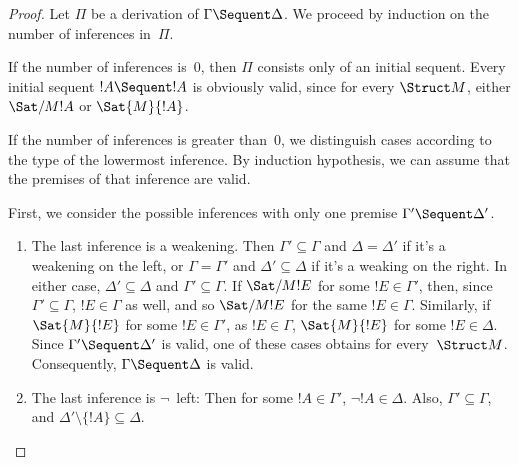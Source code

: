 \documentclass[../../include/open-logic-section]{subfiles}
\begin{document}
\begin{proof}
Let $\Pi$ be a derivation of $\Gamma \Sequent \Delta$. We proceed by
induction on the number of inferences in~$\Pi$.

If the number of inferences is~0, then $\Pi$ consists only of an
initial sequent. Every initial sequent $!A \Sequent !A$ is obviously
valid, since for every $\Struct M$, either $\Sat/{M}{!A}$ or
$\Sat{M}{!A}$.

If the number of inferences is greater than~0, we distinguish cases
according to the type of the lowermost inference. By induction
hypothesis, we can assume that the premises of that inference are
valid.

First, we consider the possible inferences with only one premise
$\Gamma' \Sequent \Delta'$.
\begin{enumerate}
\item The last inference is a weakening. Then $\Gamma' \subseteq
  \Gamma$ and $\Delta = \Delta'$ if it's a weakening on the left, or
  $\Gamma = \Gamma'$ and $\Delta' \subseteq \Delta$ if it's a weaking
  on the right.  In either case, $\Delta' \subseteq \Delta$ and
  $\Gamma' \subseteq \Gamma$.  If $\Sat/{M}{!E}$ for some $!E \in
  \Gamma'$, then, since $\Gamma' \subseteq \Gamma$, $!E \in \Gamma$ as
  well, and so $\Sat/{M}{!E}$ for the same $!E \in \Gamma$. Similarly,
  if $\Sat{M}{!E}$ for some $!E \in \Gamma'$, as $!E \in \Gamma$,
  $\Sat{M}{!E}$ for some $!E \in \Delta$. Since $\Gamma' \Sequent
  \Delta'$ is valid, one of these cases obtains for every~$\Struct
  M$. Consequently, $\Gamma \Sequent \Delta$ is valid.
\item The last inference is $\lnot$~left: Then for some $!A \in
  \Gamma'$, $\lnot !A \in \Delta$.  Also, $\Gamma' \subseteq \Gamma$,
  and $\Delta' \setminus \{!A\} \subseteq \Delta$. 


\end{enumerate}
\end{proof}
\end{document}

